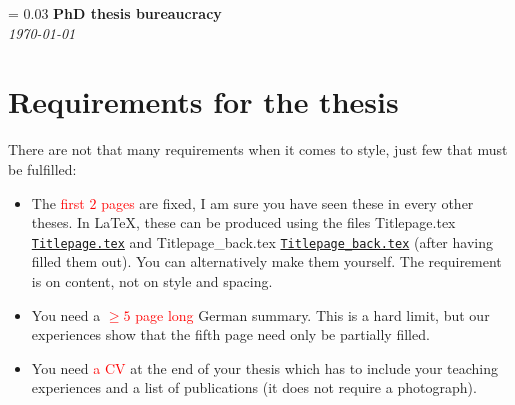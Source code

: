 \documentclass[a4paper]{article}
\newlength{\titleVerticalSpacing}
\newcommand{\myTitle}[2]{%
    \begingroup
        \titleVerticalSpacing = 0.03\textheight
        \centering
        \vspace*{\titleVerticalSpacing}
        {\Huge\bfseries #1}\\[\baselineskip]
        {\itshape #2}\\[3\baselineskip]
    \endgroup
}
\newcommand{\attention}[1]{\textcolor{red}{#1}}
\newcommand{\file}[2][]{%
    \ifthenelse{\isempty{#1}}%
        {\textcolor{fileColor}{#2}}%
        {\href{run:#1}{\texttt{\textcolor{fileColor}{#2}}}}%
}
\begin{document}
    
    \myTitle{PhD thesis bureaucracy}{\monthyeardate\today}

    \section*{Requirements for the thesis}\label{requirements}
        There are not that many requirements when it comes to style, just few that must be fulfilled:
        \begin{itemize}
            \item The \attention{first $2$ pages} are fixed, I am sure you have seen these in every other theses.
                  In \LaTeX, these can be produced using the files \file{Titlepage.tex} and \file{Titlepage\_back.tex} (after having filled them out).
                  You can alternatively make them yourself. The requirement is on content, not on style and spacing.
            \item You need a \attention{$\geq 5$ page long} German summary. This is a hard limit, but our experiences show that the fifth page need
              only be partially filled.
            \item You need \attention{a CV} at the end of your thesis which has to include your teaching experiences and a list of publications
              (it does not require a photograph).
        \end{itemize}
        
        
\end{document}
